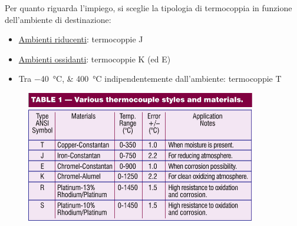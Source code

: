\documentclass[a4paper, 15pt]{article}
\begin{document}
\begin{adjustwidth}{2in}{}
	Per quanto riguarda l'impiego, si sceglie la tipologia di termocoppia in funzione dell'ambiente di destinazione: 
	\begin{itemize}
		\item \underline{Ambienti riducenti}: termocoppie J
		\item \underline{Ambienti ossidanti}: termocoppie K (ed E)
		\item Tra \SIlist{-40;400}{\celsius} indipendentemente dall'ambiente: termocoppie T
	\end{itemize}
	\begin{figure}[H]
		\centering
		\includegraphics[width=0.5\linewidth]{immagini/screenshot026}
		\label{fig:screenshot026}
	\end{figure}	
\end{adjustwidth}
\newpage
\end{document}

